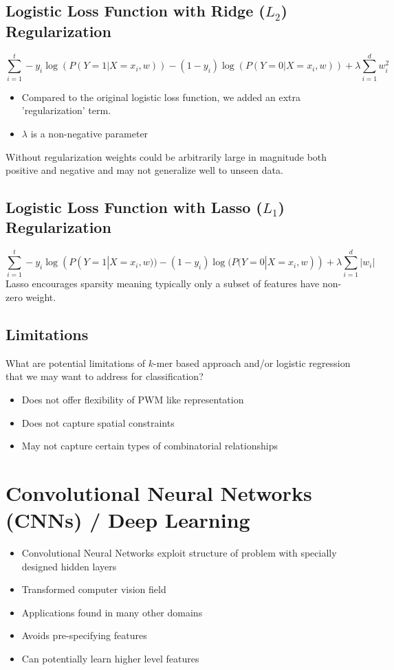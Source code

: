 \documentclass[10pt]{article}
\begin{document}
\subsection*{Logistic Loss Function with Ridge ($L_2$) Regularization}
\[\sum_{i = 1}^t - y_i \log(P(Y = 1|X = x_i, w)) - (1 - y_i) \log(P(Y = 0|X = x_i, w)) + \lambda \sum_{i = 1}^d w_i^2\]
\begin{itemize}
	\item Compared to the original logistic loss function, we added an extra 'regularization' term.
	\item $\lambda$ is a non-negative parameter
\end{itemize}
Without regularization weights could be arbitrarily large in magnitude both positive and negative and may not generalize well to unseen data.

\subsection*{Logistic Loss Function with Lasso ($L_1$) Regularization}
\[\sum_{i = 1}^t - y_i \log(P(Y = 1|X = x_i, w)) - (1 - y_i) \log(P(Y = 0|X = x_i, w)) + \lambda \sum_{i = 1}^d |w_i|\]
Lasso encourages sparsity meaning typically only a subset of features have non-zero weight.

\subsection*{Limitations}
What are potential limitations of $k$-mer based approach and/or logistic regression that we may want to address for classification?
\begin{itemize}
	\item Does not offer flexibility of PWM like representation
	\item Does not capture spatial constraints
	\item May not capture certain types of combinatorial relationships
\end{itemize}

\section*{Convolutional Neural Networks (CNNs) / Deep Learning}
\begin{itemize}
	\item Convolutional Neural Networks exploit structure of problem with specially designed hidden layers
	\item Transformed computer vision field
	\item Applications found in many other domains
	\item Avoids pre-specifying features
	\item Can potentially learn higher level features
\end{itemize}
\end{document}
